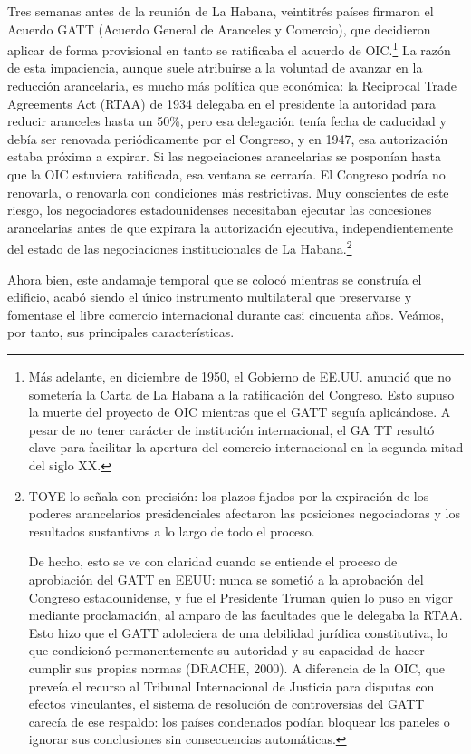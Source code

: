 \documentclass[10pt,a4paper]{article}
\begin{document}
Tres semanas antes de la reunión de La Habana, veintitrés países firmaron el Acuerdo GATT (Acuerdo General de Aranceles y Comercio), que decidieron aplicar de forma provisional en tanto se ratificaba el acuerdo de OIC.\footnote{%
    Más adelante, en diciembre de 1950, el Gobierno de EE.UU. anunció que no sometería la Carta de La Habana a la ratificación del Congreso. Esto supuso la muerte del proyecto de OIC mientras que el GATT seguía aplicándose. A pesar de no tener carácter de institución internacional, el GA TT resultó clave para facilitar la apertura del comercio internacional en la segunda mitad del siglo XX.
} La razón de esta impaciencia, aunque suele atribuirse a la voluntad de avanzar en la reducción arancelaria, es mucho más política que económica: la Reciprocal Trade Agreements Act (RTAA) de 1934 delegaba en el presidente la autoridad para reducir aranceles hasta un 50\%, pero esa delegación tenía fecha de caducidad y debía ser renovada periódicamente por el Congreso, y en 1947, esa autorización estaba próxima a expirar. Si las negociaciones arancelarias se posponían hasta que la OIC estuviera ratificada, esa ventana se cerraría. El Congreso podría no renovarla, o renovarla con condiciones más restrictivas. Muy conscientes de este riesgo, los negociadores estadounidenses necesitaban ejecutar las concesiones arancelarias antes de que expirara la autorización ejecutiva, independientemente del estado de las negociaciones institucionales de La Habana.\footnote{%
  TOYE lo señala con precisión: los plazos fijados por la expiración de los poderes arancelarios presidenciales afectaron las posiciones negociadoras y los resultados sustantivos a lo largo de todo el proceso. 

  De hecho, esto se ve con claridad cuando se entiende el proceso de aprobiación del GATT en EEUU: nunca se sometió a la aprobación del Congreso estadounidense, y fue el Presidente Truman quien lo puso en vigor mediante proclamación, al amparo de las facultades que le delegaba la RTAA. Esto hizo que el GATT adoleciera de una debilidad jurídica constitutiva, lo que condicionó permanentemente su autoridad y su capacidad de hacer cumplir sus propias normas (DRACHE, 2000). A diferencia de la OIC, que preveía el recurso al Tribunal Internacional de Justicia para disputas con efectos vinculantes, el sistema de resolución de controversias del GATT carecía de ese respaldo: los países condenados podían bloquear los paneles o ignorar sus conclusiones sin consecuencias automáticas.
}

Ahora bien, este andamaje temporal que se colocó mientras se construía el edificio, acabó siendo el único instrumento multilateral que preservarse y fomentase el libre comercio internacional durante casi cincuenta años. Veámos, por tanto, sus principales características.
\end{document}

